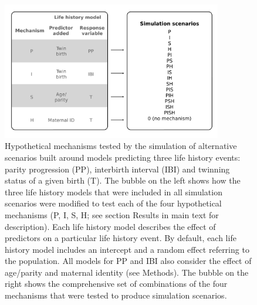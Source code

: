 \documentclass[a4paper]{article}\usepackage[]{graphicx}\usepackage[]{color}
\begin{document}
\begin{figure}[H]
\begin{center}
\includegraphics[height = 6cm]{../figures/figS3.pdf}
\end{center}
\caption{Hypothetical mechanisms tested by the simulation of alternative scenarios built around models predicting three life history events: parity progression (PP), interbirth interval (IBI) and twinning status of a given birth (T). The bubble on the left shows how the three life history models that were included in all simulation scenarios were modified to test each of the four hypothetical mechanisms (P, I, S, H; see section Results in main text for description). Each life history model describes the effect of predictors on a particular life history event. By default, each life history model includes an intercept and a random effect referring to the population. All models for PP and IBI also consider the effect of age/parity and maternal identity (see Methods). The bubble on the right shows the comprehensive set of combinations of the four mechanisms that were tested to produce simulation scenarios.}
\end{figure}
\end{document}
